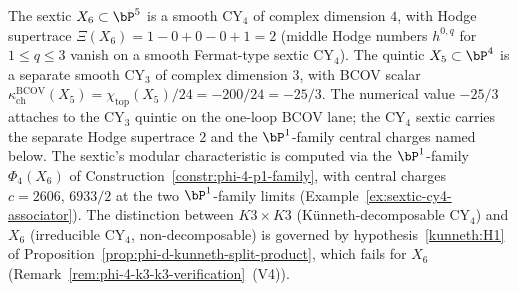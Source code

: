 \begin{remark}
\label{rem:phi-4-sextic-vs-quintic}
%
The sextic $X_6 \subset \bP^5$ is a smooth CY$_4$ of complex dimension $4$, with Hodge supertrace $\Xi(X_6) = 1 - 0 + 0 - 0 + 1 = 2$ (middle Hodge numbers $h^{0,q}$ for $1 \le q \le 3$ vanish on a smooth Fermat-type sextic CY$_4$). The quintic $X_5 \subset \bP^4$ is a separate smooth CY$_3$ of complex dimension $3$, with BCOV scalar $\kappa_{\mathrm{ch}}^{\mathrm{BCOV}}(X_5) = \chi_{\mathrm{top}}(X_5)/24 = -200/24 = -25/3$. The numerical value $-25/3$ attaches to the CY$_3$ quintic on the one-loop BCOV lane; the CY$_4$ sextic carries the separate Hodge supertrace $2$ and the $\bP^1$-family central charges named below. The sextic's modular characteristic is computed via the $\bP^1$-family $\Phi_4(X_6)$ of Construction~\textup{\ref{constr:phi-4-p1-family}}, with central charges \(c=2606,\,6933/2\) at the two $\bP^1$-family limits (Example~\textup{\ref{ex:sextic-cy4-associator}}). The distinction between $K3 \times K3$ (K\"unneth-decomposable CY$_4$) and $X_6$ (irreducible CY$_4$, non-decomposable) is governed by hypothesis~\ref{kunneth:H1} of Proposition~\textup{\ref{prop:phi-d-kunneth-split-product}}, which fails for $X_6$ (Remark~\textup{\ref{rem:phi-4-k3-k3-verification}}~(V4)).
\end{remark}


